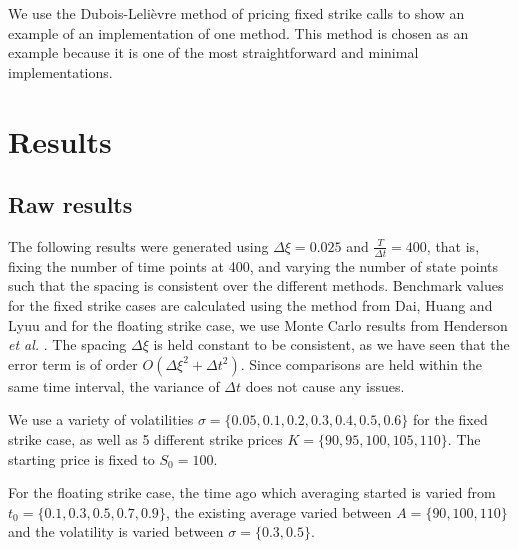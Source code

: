 \documentclass{article}
\begin{document}
We use the Dubois-Leli\`{e}vre method of pricing fixed strike calls to show an example of an implementation of one method. This method is chosen as an example because it is one of the most straightforward and minimal implementations.
\scriptsize

\normalsize

\section{Results}

\subsection{Raw results}
The following results were generated using \(\Delta\xi = 0.025\) and \(\frac{T}{\Delta t} = 400\), that is, fixing the number of time points at 400, and varying the number of state points such that the spacing is consistent over the different methods. Benchmark values for the fixed strike cases are calculated using the method from Dai, Huang and Lyuu \cite{dai_et_al} and for the floating strike case, we use Monte Carlo results from Henderson \textit{et al.} \cite{henderson_et_al}. The spacing \(\Delta\xi\) is held constant to be consistent, as we have seen that the error term is of order \(O(\Delta\xi^2 + \Delta t^2)\). Since comparisons are held within the same time interval, the variance of \(\Delta t\) does not cause any issues.

We use a variety of volatilities \(\sigma = \{0.05, 0.1, 0.2, 0.3, 0.4, 0.5, 0.6\}\) for the fixed strike case, as well as 5 different strike prices \(K = \{90, 95, 100, 105, 110\}\). The starting price is fixed to \(S_0 = 100\).

For the floating strike case, the time ago which averaging started is varied from \(t_0 = \{0.1, 0.3, 0.5, 0.7, 0.9\}\), the existing average varied between \(A = \{90, 100, 110\}\) and the volatility is varied between \(\sigma = \{0.3, 0.5\}\).
\end{document}
